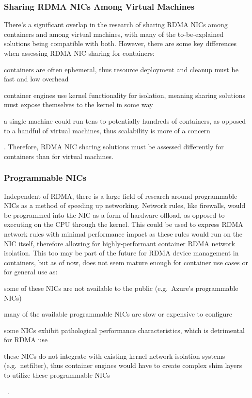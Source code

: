 \documentclass[12pt,titlepage]{article}
\begin{document}
\subsubsection{Sharing RDMA NICs Among Virtual Machines}
There's a significant overlap in the research of sharing RDMA NICs among containers and among virtual machines, with many of the to-be-explained solutions being compatible with both.
However, there are some key differences when assessing RDMA NIC sharing for containers:
\begin{enumerate*}[label={(\arabic*)},itemjoin*={{, and }},itemjoin={{, }}]
   \item containers are often ephemeral, thus resource deployment and cleanup must be fast and low overhead
   \item container engines use kernel functionality for isolation, meaning sharing solutions must expose themselves to the kernel in some way
   \item a single machine could run tens to potentially hundreds of containers, as opposed to a handful of virtual machines, thus scalability is more of a concern
\end{enumerate*}.
Therefore, RDMA NIC sharing solutions must be assessed differently for containers than for virtual machines.

\subsubsection{Programmable NICs}
Independent of RDMA, there is a large field of research around programmable NICs as a method of speeding up networking.
Network rules, like firewalls, would be programmed into the NIC as a form of hardware offload, as opposed to executing on the CPU through the kernel.
This could be used to express RDMA network rules with minimal performance impact as these rules would run on the NIC itself, therefore allowing for highly-performant container RDMA network isolation.
This too may be part of the future for RDMA device management in containers, but as of now, does not seem mature enough for container use cases or for general use as:
\begin{enumerate*}[label={(\arabic*)},itemjoin*={{, and }},itemjoin={{, }}]
   \item some of these NICs are not available to the public (e.g.\ Azure's programmable NICs)
   \item many of the available programmable NICs are slow or expensive to configure
   \item some NICs exhibit pathological performance characteristics, which is detrimental for RDMA use
   \item these NICs do not integrate with existing kernel network isolation systems (e.g.\ netfilter), thus container engines would have to create complex shim layers to utilize these programmable NICs
\end{enumerate*}~\cite{firestone2018azure,stephens2019loom,katsikas2021you,liu2021performance,kim2020case}.
\end{document}
